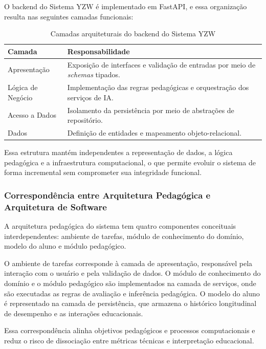 \documentclass[12pt]{article}
\begin{document}
O backend do Sistema YZW é implementado em FastAPI, e essa organização resulta nas seguintes camadas funcionais:

\begin{table}[ht]
\centering
\footnotesize
\caption{Camadas arquiteturais do backend do Sistema YZW}
\label{tab:camadas-arquitetura}
\begin{tabular}{p{4cm} p{8cm}}
\toprule
\textbf{Camada} & \textbf{Responsabilidade} \\
\midrule
Apresentação &
Exposição de interfaces e validação de entradas por meio de \textit{schemas} tipados. \\

Lógica de Negócio &
Implementação das regras pedagógicas e orquestração dos serviços de IA. \\

Acesso a Dados &
Isolamento da persistência por meio de abstrações de repositório. \\

Dados &
Definição de entidades e mapeamento objeto-relacional. \\
\bottomrule
\end{tabular}
\end{table}

Essa estrutura mantém independentes a representação de dados, a lógica pedagógica e a infraestrutura computacional, o que permite evoluir o sistema de forma incremental sem comprometer sua integridade funcional.

\subsubsection{Correspondência entre Arquitetura Pedagógica e Arquitetura de Software}

A arquitetura pedagógica do sistema tem quatro componentes conceituais interdependentes: ambiente de tarefas, módulo de conhecimento do domínio, modelo do aluno e módulo pedagógico.

O ambiente de tarefas corresponde à camada de apresentação, responsável pela interação com o usuário e pela validação de dados. O módulo de conhecimento do domínio e o módulo pedagógico são implementados na camada de serviços, onde são executadas as regras de avaliação e inferência pedagógica. O modelo do aluno é representado na camada de persistência, que armazena o histórico longitudinal de desempenho e as interações educacionais.

Essa correspondência alinha objetivos pedagógicos e processos computacionais e reduz o risco de dissociação entre métricas técnicas e interpretação educacional.
\end{document}
